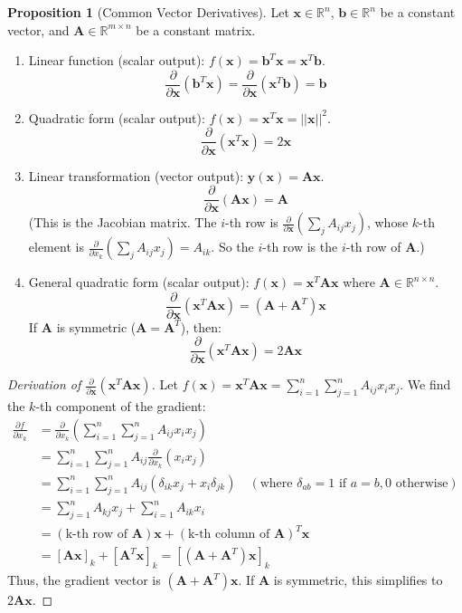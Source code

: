 \documentclass[12pt, letterpaper]{article}
\theoremstyle{definition}
\newtheorem{proposition}{Proposition}[section]
\newcommand{\R}{\mathbb{R}}
\newcommand{\mat}[1]{\mathbf{#1}} %
\newcommand{\vect}[1]{\mathbf{#1}} %
\newcommand{\x}{\vect{x}} %
\newcommand{\y}{\vect{y}} %
\newcommand{\bvec}{\vect{b}} %
\begin{document}
\begin{proposition}[Common Vector Derivatives]
Let $\x \in \R^n$, $\bvec \in \R^n$ be a constant vector, and $\mat{A} \in \R^{m \times n}$ be a constant matrix.
\begin{enumerate}
    \item Linear function (scalar output): $f(\x) = \bvec^T \x = \x^T \bvec$.
    \[ \frac{\partial}{\partial \x} (\bvec^T \x) = \frac{\partial}{\partial \x} (\x^T \bvec) = \bvec \]
    \item Quadratic form (scalar output): $f(\x) = \x^T \x = ||\x||^2$.
    \[ \frac{\partial}{\partial \x} (\x^T \x) = 2\x \]
    \item Linear transformation (vector output): $\y(\x) = \mat{A}\x$.
    \[ \frac{\partial}{\partial \x} (\mat{A}\x) = \mat{A} \]
    (This is the Jacobian matrix. The $i$-th row is $\frac{\partial}{\partial \x}(\sum_j A_{ij}x_j)$, whose $k$-th element is $\frac{\partial}{\partial x_k}(\sum_j A_{ij}x_j) = A_{ik}$. So the $i$-th row is the $i$-th row of $\mat{A}$.)
    \item General quadratic form (scalar output): $f(\x) = \x^T \mat{A} \x$ where $\mat{A} \in \R^{n \times n}$.
    \[ \frac{\partial}{\partial \x} (\x^T \mat{A} \x) = (\mat{A} + \mat{A}^T) \x \]
    If $\mat{A}$ is symmetric ($\mat{A} = \mat{A}^T$), then:
    \[ \frac{\partial}{\partial \x} (\x^T \mat{A} \x) = 2\mat{A} \x \]
\end{enumerate}
\end{proposition}
\begin{proof}[Derivation of $\frac{\partial}{\partial \x} (\x^T \mat{A} \x)$]
Let $f(\x) = \x^T \mat{A} \x = \sum_{i=1}^n \sum_{j=1}^n A_{ij} x_i x_j$. We find the $k$-th component of the gradient:
\begin{align*} \frac{\partial f}{\partial x_k} &= \frac{\partial}{\partial x_k} \left( \sum_{i=1}^n \sum_{j=1}^n A_{ij} x_i x_j \right) \\ &= \sum_{i=1}^n \sum_{j=1}^n A_{ij} \frac{\partial}{\partial x_k} (x_i x_j) \\ &= \sum_{i=1}^n \sum_{j=1}^n A_{ij} (\delta_{ik} x_j + x_i \delta_{jk}) \quad (\text{where } \delta_{ab}=1 \text{ if } a=b, 0 \text{ otherwise}) \\ &= \sum_{j=1}^n A_{kj} x_j + \sum_{i=1}^n A_{ik} x_i \\ &= (\text{k-th row of } \mat{A}) \x + (\text{k-th column of } \mat{A})^T \x \\ &= [\mat{A}\x]_k + [\mat{A}^T\x]_k = [(\mat{A} + \mat{A}^T)\x]_k \end{align*}
Thus, the gradient vector is $(\mat{A} + \mat{A}^T)\x$. If $\mat{A}$ is symmetric, this simplifies to $2\mat{A}\x$.
\end{proof}
\end{document}
